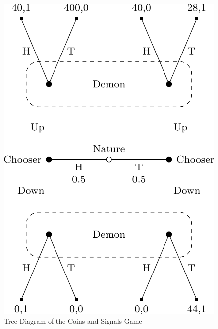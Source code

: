 \documentclass[
  12pt,
  letterpaper,
  DIV=11,
  numbers=noendperiod]{scrreprt}
\begin{document}
\begin{figure}

{\centering \includegraphics{war-signal_files/figure-pdf/fig-second-anti-war-1.png}

}

\caption{\label{fig-second-anti-war}Tree Diagram of the Coins and
Signals Game}

\end{figure}
\end{document}
